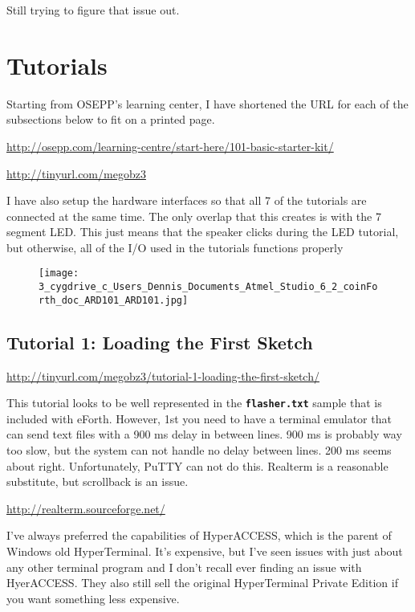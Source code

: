 \documentclass[10pt,english]{article}
\begin{document}
Still trying to figure that issue out.


\section{Tutorials}

Starting from OSEPP's learning center, I have shortened the URL for
each of the subsections below to fit on a printed page.

\url{http://osepp.com/learning-centre/start-here/101-basic-starter-kit/}

\url{http://tinyurl.com/megobz3}

I have also setup the hardware interfaces so that all 7 of the tutorials
are connected at the same time. The only overlap that this creates
is with the 7 segment LED. This just means that the speaker clicks
during the LED tutorial, but otherwise, all of the I/O used in the
tutorials functions properly

\begin{figure}
\caption{\protect\texttt{[image: 3\_cygdrive\_c\_Users\_Dennis\_Documents\_Atmel\_Studio\_6\_2\_coinForth\_doc\_ARD101\_ARD101.jpg]}}
\end{figure}



\subsection{Tutorial 1: Loading the First Sketch}

\url{http://tinyurl.com/megobz3/tutorial-1-loading-the-first-sketch/}

This tutorial looks to be well represented in the \texttt{\textbf{flasher.txt}}
sample that is included with eForth. However, 1st you need to have
a terminal emulator that can send text files with a 900 ms delay in
between lines. 900 ms is probably way too slow, but the system can
not handle no delay between lines. 200 ms seems about right. Unfortunately,
PuTTY can not do this. Realterm is a reasonable substitute, but scrollback
is an issue.

\url{http://realterm.sourceforge.net/}

I've always preferred the capabilities of HyperACCESS, which is the
parent of Windows old HyperTerminal. It's expensive, but I've seen
issues with just about any other terminal program and I don't recall
ever finding an issue with HyerACCESS. They also still sell the original
HyperTerminal Private Edition if you want something less expensive.
\end{document}
